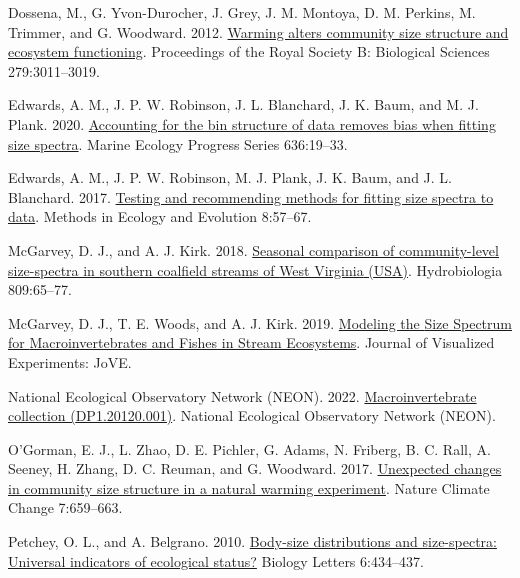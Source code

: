 \documentclass[
]{article}
\newlength{\cslhangindent}
\newlength{\cslentryspacingunit} %
\newenvironment{CSLReferences}[2] %
 {%
  \setlength{\parindent}{0pt}
  \ifodd #1
  \let\oldpar\par
  \def\par{\hangindent=\cslhangindent\oldpar}
  \fi
  \setlength{\parskip}{#2\cslentryspacingunit}
 }%
 {}
\begin{document}
\hypertarget{refs}{}
\begin{CSLReferences}{1}{0}
\leavevmode{}%
Dossena, M., G. Yvon-Durocher, J. Grey, J. M. Montoya, D. M. Perkins, M.
Trimmer, and G. Woodward. 2012.
\href{https://doi.org/10.1098/rspb.2012.0394}{Warming alters community
size structure and ecosystem functioning}. Proceedings of the Royal
Society B: Biological Sciences 279:3011--3019.

\leavevmode{}%
Edwards, A. M., J. P. W. Robinson, J. L. Blanchard, J. K. Baum, and M.
J. Plank. 2020. \href{https://doi.org/10.3354/meps13230}{Accounting for
the bin structure of data removes bias when fitting size spectra}.
Marine Ecology Progress Series 636:19--33.

\leavevmode{}%
Edwards, A. M., J. P. W. Robinson, M. J. Plank, J. K. Baum, and J. L.
Blanchard. 2017. \href{https://doi.org/10.1111/2041-210X.12641}{Testing
and recommending methods for fitting size spectra to data}. Methods in
Ecology and Evolution 8:57--67.

\leavevmode{}%
McGarvey, D. J., and A. J. Kirk. 2018.
\href{https://doi.org/10.1007/s10750-017-3448-0}{Seasonal comparison of
community-level size-spectra in southern coalfield streams of {West
Virginia} ({USA})}. Hydrobiologia 809:65--77.

\leavevmode{}%
McGarvey, D. J., T. E. Woods, and A. J. Kirk. 2019.
\href{https://doi.org/10.3791/59945}{Modeling the {Size Spectrum} for
{Macroinvertebrates} and {Fishes} in {Stream Ecosystems}}. Journal of
Visualized Experiments: JoVE.

\leavevmode{}%
National Ecological Observatory Network (NEON). 2022.
\href{https://doi.org/10.48443/GN8X-K322}{Macroinvertebrate collection
({DP1}.20120.001)}. {National Ecological Observatory Network (NEON)}.

\leavevmode{}%
O'Gorman, E. J., L. Zhao, D. E. Pichler, G. Adams, N. Friberg, B. C.
Rall, A. Seeney, H. Zhang, D. C. Reuman, and G. Woodward. 2017.
\href{https://doi.org/10.1038/nclimate3368}{Unexpected changes in
community size structure in a natural warming experiment}. Nature
Climate Change 7:659--663.

\leavevmode{}%
Petchey, O. L., and A. Belgrano. 2010.
\href{https://doi.org/10.1098/rsbl.2010.0240}{Body-size distributions
and size-spectra: Universal indicators of ecological status?} Biology
Letters 6:434--437.


\end{CSLReferences}
\end{document}
